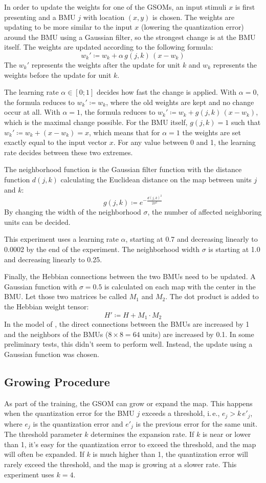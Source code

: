 \documentclass[twocolumn]{article}
\begin{document}
In order to update the weights for one of the GSOMs, an input stimuli $x$ is first presenting and a BMU $j$ with location $(x, y)$ is chosen. The weights are updating to be more similar to the input $x$ (lowering the quantization error) around the BMU using a Gaussian filter, so the strongest change is at the BMU itself. The weights are updated according to the following formula: \[
w_k' \coloneq w_k + \alpha \, g(j, k) \, (x - w_k)
\]
The $w_k'$ represents the weights after the update for unit $k$ and $w_k$ represents the weights before the update for unit $k$.

The learning rate $\alpha \in [0;1]$ decides how fast the change is applied. With $\alpha = 0$, the formula reduces to $w_k' \coloneq w_k$, where the old weights are kept and no change occur at all. With $\alpha = 1$, the formula reduces to $w_k' \coloneq w_k + g(j, k) \, (x - w_k)$, which is the maximal change possible. For the BMU itself, $g(j, k) = 1$ such that $w_k' \coloneq w_k + (x - w_k) = x$, which means that for $\alpha = 1$ the weights are set exactly equal to the input vector $x$. For any value between 0 and 1, the learning rate decides between these two extremes.

The neighborhood function is the Gaussian filter function with the distance function $d(j, k)$ calculating the Euclidean distance on the map between units $j$ and $k$: \[
g(j, k) \coloneq e^{-\frac{d(j, k)^2}{2\sigma^2}}
\]
By changing the width of the neighborhood $\sigma$, the number of affected neighboring units can be decided.

This experiment uses a learning rate $\alpha$, starting at 0.7 and decreasing linearly to 0.0002 by the end of the experiment. The neighborhood width $\sigma$ is starting at 1.0 and decreasing linearly to 0.25.

Finally, the Hebbian connections between the two BMUs need to be updated. A Gaussian function with $\sigma = 0.5$ is calculated on each map with the center in the BMU. Let those two matrices be called $M_1$ and $M_2$. The dot product is added to the Hebbian weight tensor: \[
H' \coloneq H + M_1 \cdot M_2
\]
In the model of \textcite{gliozzi_visual_2018}, the direct connections between the BMUs are increased by 1 and the neighbors of the BMUs ($8 \times 8 = 64$ units) are increased by 0.1. In some preliminary tests, this didn't seem to perform well. Instead, the update using a Gaussian function was chosen.

\subsection{Growing Procedure} \label{sub:growing}
As part of the training, the GSOM can grow or expand the map. This happens when the quantization error for the BMU $j$ exceeds a threshold, i.\,e., $e_j > k \, e'_j$, where $e_j$ is the quantization error and $e'_j$ is the previous error for the same unit. The threshold parameter $k$ determines the expansion rate. If $k$ is near or lower than 1, it's easy for the quantization error to exceed the threshold, and the map will often be expanded. If $k$ is much higher than 1, the quantization error will rarely exceed the threshold, and the map is growing at a slower rate. This experiment uses $k = 4$.
\end{document}
